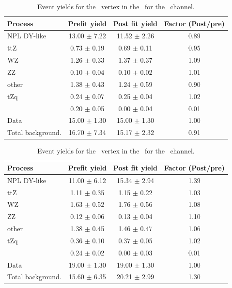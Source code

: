 \begin{table}[htbp]
	\centering
	\caption{Event yields for the \Zct\ vertex in the \TTCR\  for the \emumu\ channel. }
	\begin{tabular} {l c c c }
		\toprule
		Process & Prefit yield & Post fit yield & Factor (Post/pre) \\
		\midrule
		NPL DY-like & 13.00 $ \pm $ 7.22 & 11.52 $ \pm $ 2.26 & 0.89 \\ 
		ttZ & 0.73 $ \pm $ 0.19 & 0.69 $ \pm $ 0.11 & 0.95 \\ 
		WZ & 1.26 $ \pm $ 0.33 & 1.37 $ \pm $ 0.37 & 1.09 \\ 
		ZZ & 0.10 $ \pm $ 0.04 & 0.10 $ \pm $ 0.02 & 1.01 \\ 
		other & 1.38 $ \pm $ 0.43 & 1.24 $ \pm $ 0.59 & 0.90 \\ 
		tZq & 0.24 $ \pm $ 0.07 & 0.25 $ \pm $ 0.04 & 1.02 \\ 
		\kZct  & 0.20 $ \pm $ 0.05 & 0.00 $ \pm $ 0.04 & 0.01\\
		\hdashline
		Data & 15.00 $ \pm $ 1.30 & 15.00 $ \pm $ 1.30 & 1.00\\
		Total background. & 16.70 $ \pm $ 7.34 & 15.17 $ \pm $ 2.32 & 0.91\\
		\bottomrule
	\end{tabular}
\end{table}
\begin{table}[htbp]
	\centering
	\caption{Event yields for the \Zct\ vertex in the \TTCR\  for the \mumumu\ channel. }
	\begin{tabular} {l c c c }
		\toprule
		Process & Prefit yield & Post fit yield & Factor (Post/pre) \\
		\midrule
		NPL DY-like & 11.00 $ \pm $ 6.12 & 15.34 $ \pm $ 2.94 & 1.39 \\ 
		ttZ & 1.11 $ \pm $ 0.35 & 1.15 $ \pm $ 0.22 & 1.03 \\ 
		WZ & 1.63 $ \pm $ 0.52 & 1.76 $ \pm $ 0.56 & 1.08 \\ 
		ZZ & 0.12 $ \pm $ 0.06 & 0.13 $ \pm $ 0.04 & 1.10 \\ 
		other & 1.38 $ \pm $ 0.45 & 1.46 $ \pm $ 0.47 & 1.06 \\ 
		tZq & 0.36 $ \pm $ 0.10 & 0.37 $ \pm $ 0.05 & 1.02 \\ 
		\kZct  & 0.24 $ \pm $ 0.02 & 0.00 $ \pm $ 0.03 & 0.01\\
		\hdashline
		Data & 19.00 $ \pm $ 1.30 & 19.00 $ \pm $ 1.30 & 1.00\\
		Total background. & 15.60 $ \pm $ 6.35 & 20.21 $ \pm $ 2.99 & 1.30\\
		\bottomrule
	\end{tabular}
\end{table}

